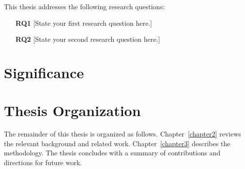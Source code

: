 \noindent
This thesis addresses the following research questions:

\begin{enumerate}
    \item[\textbf{RQ1}] [State your first research question here.]
    \item[\textbf{RQ2}] [State your second research question here.]
\end{enumerate}


\section{Significance}



\section{Thesis Organization}

\newline

\noindent
The remainder of this thesis is organized as follows.
Chapter~\ref{chapter2} reviews the relevant background and
related work. Chapter~\ref{chapter3} describes the methodology.
The thesis concludes with a summary of contributions and directions
for future work.
\newline
